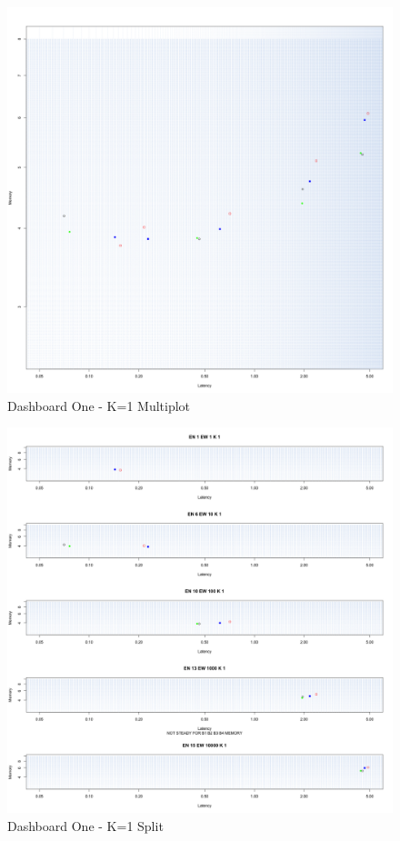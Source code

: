 \begin{figure}[h!tb]
	\centering
	\includegraphics[width=0.90\linewidth]{images/dashboard-1}	
	\caption[\textsc{Analyser} Investigation Stack - Level 0 - Dashboard One - Multiplot Version]{Dashboard One - K=1 Multiplot} 
	\label{fig:result_dashboard_kb}
\end{figure}

\begin{figure}[t!hb]
	\centering
	\includegraphics[width=\linewidth]{images/dashboard-1-split}	
	\caption[\textsc{Analyser} Investigation Stack - Level 0 - Dashboard One - Split Version]{Dashboard One - K=1 Split} 
	\label{fig:result_dashboard_ka}
\end{figure}

